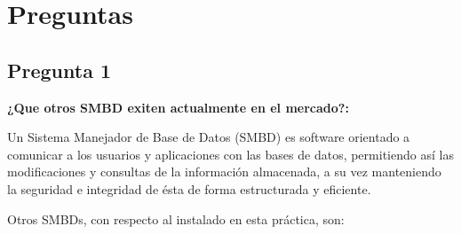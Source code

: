 \section{Preguntas}


\subsection*{Pregunta 1}
\textbf{¿Que otros SMBD exiten actualmente en el mercado?:}

Un Sistema Manejador de Base de Datos (SMBD) es software orientado a comunicar a los usuarios y aplicaciones con las bases de datos, permitiendo así las modificaciones y consultas de la información almacenada, a su vez manteniendo la seguridad e integridad de ésta de forma estructurada y eficiente. 

Otros SMBDs, con respecto al instalado en esta práctica, son:

